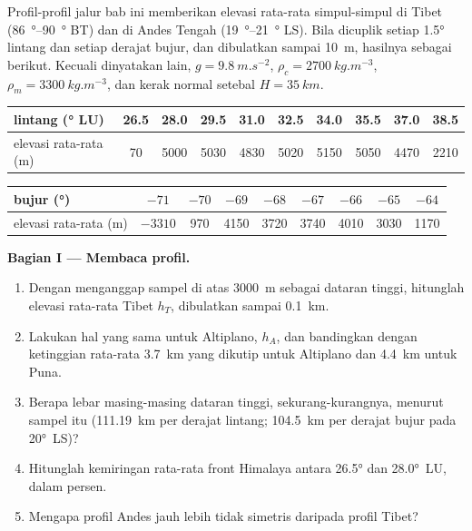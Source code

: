 \begin{problem}\label{pb:b2:himalaya-andes:1}
Profil-profil jalur bab ini memberikan elevasi rata-rata simpul-simpul di Tibet
(\qtyrange{86}{90}{\degree} BT) dan di Andes Tengah (\qtyrange{19}{21}{\degree} LS).
Bila dicuplik setiap \ang{1.5} lintang dan setiap derajat bujur, dan dibulatkan sampai \qty{10}{m}, hasilnya
sebagai berikut. Kecuali dinyatakan lain, $g = \qty{9.8}{m.s^{-2}}$, $\rho_c = \qty{2700}{kg.m^{-3}}$,
$\rho_m = \qty{3300}{kg.m^{-3}}$, dan kerak normal setebal $H = \qty{35}{km}$.

\smallskip
\begin{center}\small
\begin{tabular}{l|ccccccccc}
lintang (\unit{\degree} LU) & 26.5 & 28.0 & 29.5 & 31.0 & 32.5 & 34.0 & 35.5 & 37.0 & 38.5 \\ \hline
elevasi rata-rata (\unit{m}) & 70 & 5000 & 5030 & 4830 & 5020 & 5150 & 5050 & 4470 & 2210
\end{tabular}

\smallskip
\begin{tabular}{l|cccccccc}
bujur (\unit{\degree}) & $-71$ & $-70$ & $-69$ & $-68$ & $-67$ & $-66$ & $-65$ & $-64$ \\ \hline
elevasi rata-rata (\unit{m}) & $-3310$ & 970 & 4150 & 3720 & 3740 & 4010 & 3030 & 1170
\end{tabular}
\end{center}
\smallskip

\noindent\textbf{Bagian I --- Membaca profil.}
\begin{enumerate}
\item Dengan menganggap sampel di atas \qty{3000}{m} sebagai dataran tinggi, hitunglah elevasi rata-rata Tibet
$h_T$, dibulatkan sampai \qty{0.1}{km}.
\item Lakukan hal yang sama untuk Altiplano, $h_A$, dan bandingkan dengan ketinggian rata-rata
\qty{3.7}{km} yang dikutip untuk Altiplano dan \qty{4.4}{km} untuk Puna.
\item Berapa lebar masing-masing dataran tinggi, sekurang-kurangnya, menurut sampel itu (\qty{111.19}{km} per
derajat lintang; \qty{104.5}{km} per derajat bujur pada \ang{20}~LS)?
\item Hitunglah kemiringan rata-rata front Himalaya antara \ang{26.5} dan \ang{28.0}~LU, dalam
persen.
\item Mengapa profil Andes jauh lebih tidak simetris daripada profil Tibet?
\end{enumerate}


\end{problem}
